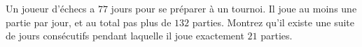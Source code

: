 Un joueur d'échecs a $77$ jours pour se préparer à un tournoi. Il joue au
moins une partie par jour, et au total pas plus de $132$ parties. Montrez
qu'il existe une suite de jours consécutifs pendant laquelle il joue
exactement $21$ parties.
